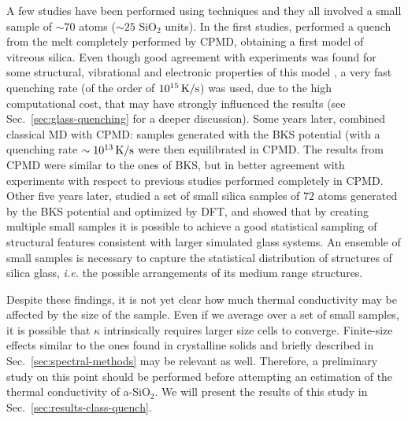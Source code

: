 A few studies have been performed using \abinitio techniques and they all involved a small sample of $\sim70$ atoms ($\sim 25$ SiO$_2$ units). In the first \abinitio studies, \citet{Sarnthein1995a} performed a quench from the melt completely performed by CPMD, obtaining a first model of vitreous silica. Even though good agreement with experiments was found for some structural, vibrational and electronic properties of this model \cite{Sarnthein1995a,Sarnthein1995b,Sarnthein1997}, a very fast quenching rate (of the order of $10^{15}\,\mathrm{K/s}$) was used, due to the high computational cost, that may have strongly influenced the results (see Sec.~\ref{sec:glass-quenching} for a deeper discussion). 
Some years later, \citet{Benoit2000} combined classical MD with CPMD: samples generated with the BKS potential (with a quenching rate $\sim 10^{13}\,\mathrm{K/s}$ were then equilibrated in CPMD. The results from CPMD were similar to the ones of BKS, but in better agreement with experiments with respect to previous studies performed completely in CPMD.
Other five years later, \citet{VanGinhoven2005} studied a set of small silica samples of $72$ atoms generated by the BKS potential and optimized by DFT, and showed that by creating multiple small samples it is possible to achieve a good statistical sampling of structural features consistent with larger simulated glass systems. An ensemble of small samples is necessary to capture the statistical distribution of structures of silica glass, \emph{i.e.} the possible arrangements of its medium range structures. 

Despite these findings, it is not yet clear how much thermal conductivity may be affected by the size of the sample. Even if we average over a set of small samples, it is possible that $\kappa$ intrinsically requires larger size cells to converge. Finite-size effects similar to the ones found in crystalline solids and briefly described in Sec.~\ref{sec:spectral-methods} may be relevant as well. 
Therefore, a preliminary study on this point should be performed before attempting an \abinitio estimation of the thermal conductivity of a-SiO$_2$. We will present the results of this study in Sec.~\ref{sec:results-class-quench}.


